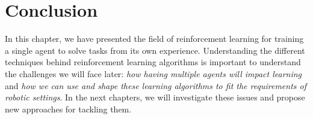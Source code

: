







\section{Conclusion}

In this chapter, we have presented the field of reinforcement learning for training a single agent to solve tasks from its own experience. Understanding the different techniques behind reinforcement learning algorithms is important to understand the challenges we will face later: \textit{how having multiple agents will impact learning} and \textit{how we can use and shape these learning algorithms to fit the requirements of robotic settings}. In the next chapters, we will investigate these issues and propose new approaches for tackling them. 